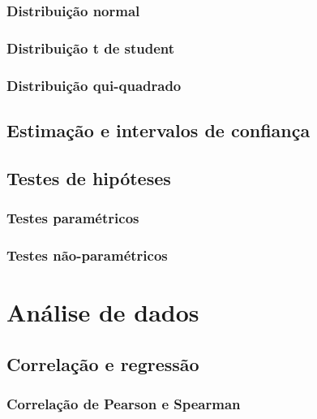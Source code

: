 \documentclass[
]{book}
\begin{document}
\subsection{Distribuição normal}\label{distribuiuxe7uxe3o-normal}

\subsection{Distribuição t de student}\label{distribuiuxe7uxe3o-t-de-student}

\subsection{Distribuição qui-quadrado}\label{distribuiuxe7uxe3o-qui-quadrado}

\section{Estimação e intervalos de confiança}\label{estimauxe7uxe3o-e-intervalos-de-confianuxe7a}

\section{Testes de hipóteses}\label{testes-de-hipuxf3teses}

\subsection{Testes paramétricos}\label{testes-paramuxe9tricos}

\subsection{Testes não-paramétricos}\label{testes-nuxe3o-paramuxe9tricos}

\chapter{Análise de dados}\label{anuxe1lise-de-dados}

\section{Correlação e regressão}\label{correlauxe7uxe3o-e-regressuxe3o}

\subsection{Correlação de Pearson e Spearman}\label{correlauxe7uxe3o-de-pearson-e-spearman}
\end{document}
